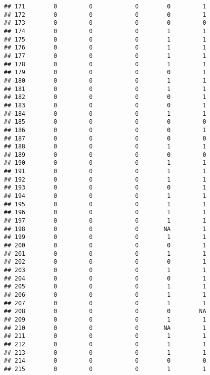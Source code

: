 \documentclass[
]{article}
\begin{document}
\begin{verbatim}
## 171        0         0            0        0         1
## 172        0         0            0        0         1
## 173        0         0            0        0         0
## 174        0         0            0        1         1
## 175        0         0            0        1         1
## 176        0         0            0        1         1
## 177        0         0            0        1         1
## 178        0         0            0        1         1
## 179        0         0            0        0         1
## 180        0         0            0        1         1
## 181        0         0            0        1         1
## 182        0         0            0        0         1
## 183        0         0            0        0         1
## 184        0         0            0        1         1
## 185        0         0            0        0         0
## 186        0         0            0        0         1
## 187        0         0            0        0         0
## 188        0         0            0        1         1
## 189        0         0            0        0         0
## 190        0         0            0        1         1
## 191        0         0            0        1         1
## 192        0         0            0        1         1
## 193        0         0            0        0         1
## 194        0         0            0        1         1
## 195        0         0            0        1         1
## 196        0         0            0        1         1
## 197        0         0            0        1         1
## 198        0         0            0       NA         1
## 199        0         0            0        1         1
## 200        0         0            0        0         1
## 201        0         0            0        1         1
## 202        0         0            0        0         1
## 203        0         0            0        1         1
## 204        0         0            0        0         1
## 205        0         0            0        1         1
## 206        0         0            0        1         1
## 207        0         0            0        1         1
## 208        0         0            0        0        NA
## 209        0         0            0        1         1
## 210        0         0            0       NA         1
## 211        0         0            0        1         1
## 212        0         0            0        1         1
## 213        0         0            0        1         1
## 214        0         0            0        0         0
## 215        0         0            0        1         1

\end{verbatim}
\end{document}
